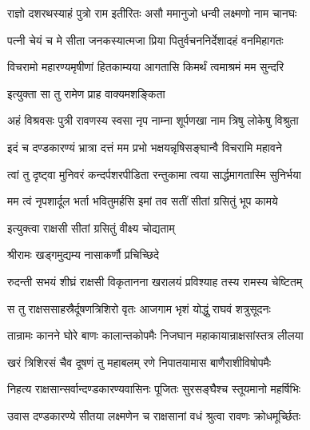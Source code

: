 


\twolineshloka
{राज्ञो दशरथस्याहं पुत्रो राम इतीरितः}
{असौ ममानुजो धन्वी लक्ष्मणो नाम चानघः}%

\twolineshloka
{पत्नी चेयं च मे सीता जनकस्यात्मजा प्रिया}
{पितुर्वचननिर्देशादहं वनमिहागतः}%

\twolineshloka
{विचरामो महारण्यमृषीणां हितकाम्यया}
{आगतासि किमर्थं त्वमाश्रमं मम सुन्दरि}%


\onelineshloka
{इत्युक्ता सा तु रामेण प्राह वाक्यमशङ्किता}%


\twolineshloka
{अहं विश्रवसः पुत्री रावणस्य स्वसा नृप}
{नाम्ना शूर्पणखा नाम त्रिषु लोकेषु विश्रुता}%

\twolineshloka
{इदं च दण्डकारण्यं भ्रात्रा दत्तं मम प्रभो}
{भक्षयन्नृषिसङ्घान्वै विचरामि महावने}%

\twolineshloka
{त्वां तु दृष्ट्वा मुनिवरं कन्दर्पशरपीडिता}
{रन्तुकामा त्वया सार्द्धमागतास्मि सुनिर्भया}%

\twolineshloka
{मम त्वं नृपशार्दूल भर्ता भवितुमर्हसि}
{इमां तव सतीं सीतां ग्रसितुं भूप कामये}%



\onelineshloka
{इत्युक्त्वा राक्षसी सीतां ग्रसितुं वीक्ष्य चोद्यताम्}%

\onelineshloka
{श्रीरामः खड्गमुद्यम्य नासाकर्णौ प्रचिच्छिदे}%

\twolineshloka
{रुदन्ती सभयं शीघ्रं राक्षसी विकृतानना}
{खरालयं प्रविश्याह तस्य रामस्य चेष्टितम्}%

\twolineshloka
{स तु राक्षससाहस्रैर्दूषणत्रिशिरो वृतः}
{आजगाम भृशं योद्धुं राघवं शत्रुसूदनः}%

\twolineshloka
{तान्रामः कानने घोरे बाणः कालान्तकोपमैः}
{निजघान महाकायान्राक्षसांस्तत्र लीलया}%

\twolineshloka
{खरं त्रिशिरसं चैव दूषणं तु महाबलम्}
{रणे निपातयामास बाणैराशीविषोपमैः}%

\twolineshloka
{निहत्य राक्षसान्सर्वान्दण्डकारण्यवासिनः}
{पूजितः सुरसङ्घैश्च स्तूयमानो महर्षिभिः}%

\twolineshloka
{उवास दण्डकारण्ये सीतया लक्ष्मणेन च}
{राक्षसानां वधं श्रुत्वा रावणः क्रोधमूर्च्छितः}%


